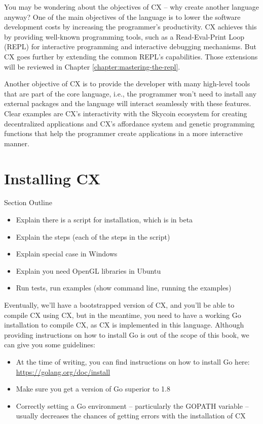 \documentclass[11pt,fleqn,openany]{book} %
\begin{document}
You may be wondering about the objectives of CX -- why create another language anyway? One of the main objectives of the language is to lower the software development costs by increasing the programmer's productivity. CX achieves this by providing well-known programming tools, such as a Read-Eval-Print Loop (REPL) for interactive programming and interactive debugging mechanisms. But CX goes further by extending the common REPL's capabilities. Those extensions will be reviewed in Chapter \ref{chapter:mastering-the-repl}.

Another objective of CX is to provide the developer with many high-level tools that are part of the core language, i.e., the programmer won't need to install any external packages and the language will interact seamlessly with these features. Clear examples are CX's interactivity with the Skycoin ecosystem for creating decentralized applications and CX's affordance system and genetic programming functions that help the programmer create applications in a more interactive manner.

\section{Installing CX}

\begin{remark}
Section Outline
    \begin{itemize}
    	\item Explain there is a script for installation, which is in beta
        \item Explain the steps (each of the steps in the script)
        \item Explain special case in Windows
        \item Explain you need OpenGL libraries in Ubuntu
        \item Run tests, run examples (show command line, running the examples)
    \end{itemize}
\end{remark}

Eventually, we'll have a bootstrapped version of CX, and you'll be able to compile CX using CX, but in the meantime, you need to have a working Go installation to compile CX, as CX is implemented in this language. Although providing instructions on how to install Go is out of the scope of this book, we can give you some guidelines:

\begin{itemize}
\item At the time of writing, you can find instructions on how to install Go here: \url{https://golang.org/doc/install}
\item Make sure you get a version of Go superior to 1.8
\item Correctly setting a Go environment -- particularly the GOPATH variable -- usually decreases the chances of getting errors with the installation of CX
\end{itemize}
\end{document}
